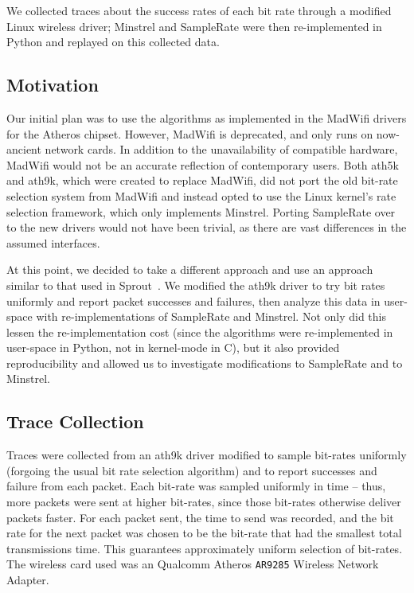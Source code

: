 \documentclass[letterpaper,twocolumn,10pt]{article}
\begin{document}
We collected traces about the success rates of each bit rate through a modified Linux wireless driver; Minstrel and SampleRate were then re-implemented in Python and replayed on this collected data.

\subsection{Motivation}

Our initial plan was to use the algorithms as implemented in the MadWifi drivers for the Atheros chipset. However, MadWifi is deprecated, and only runs on now-ancient network cards. In addition to the unavailability of compatible hardware, MadWifi would not be an accurate reflection of contemporary users. Both ath5k and ath9k, which were created to replace MadWifi, did not port the old bit-rate selection system from MadWifi and instead opted to use the Linux kernel's rate selection framework, which only implements Minstrel.  Porting SampleRate over to the new drivers would not have been trivial, as there are vast differences in the assumed interfaces. 

At this point, we decided to take a different approach and use an approach similar to that used in Sprout~\cite{sprout}.  We modified the ath9k driver to try bit rates uniformly and report packet successes and failures, then analyze this data in user-space with re-implementations of SampleRate and Minstrel.  Not only did this lessen the re-implementation cost (since the algorithms were re-implemented in user-space in Python, not in kernel-mode in C), but it also provided reproducibility and allowed us to investigate modifications to SampleRate and to Minstrel.

\subsection{Trace Collection}

Traces were collected from an ath9k driver modified to sample bit-rates uniformly (forgoing the usual bit rate selection algorithm) and to report successes and failure from each packet.  Each bit-rate was sampled uniformly in time -- thus, more packets were sent at higher bit-rates, since those bit-rates otherwise deliver packets faster.  For each packet sent, the time to send was recorded, and the bit rate for the next packet was chosen to be the bit-rate that had the smallest total transmissions time.  This guarantees approximately uniform selection of bit-rates.  The wireless card used was an Qualcomm Atheros \texttt{AR9285} Wireless Network Adapter.
\end{document}
